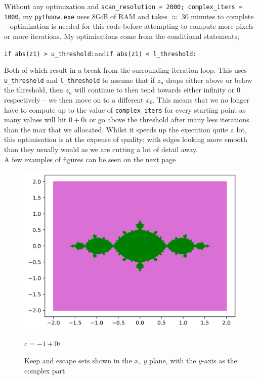 \documentclass[12pt]{article}
\begin{document}
Without any optimization and \texttt{scan\_resolution = 2000; complex\_iters = 1000}, my \texttt{pythonw.exe} uses 8GiB of RAM and takes $\approx$ 30 minutes to complete -- optimization is needed for this code before attempting to compute more pixels or more iterations.
My optimisations come from the conditional statements;
\begin{center}
	\texttt{if abs(z1) > u\_threshold:}\quad and\quad \texttt{if abs(z1) < l\_threshold:}
\end{center}
Both of which result in a break from the surrounding iteration loop. This uses \texttt{u\_threshold} and \texttt{l\_threshold} to assume that if $z_n$ drops either above or below the threshold, then $z_n$ will continue to then tend towards either infinity or 0 respectively -- we then move on to a different $x_0$. This means that we no longer have to compute up to the value of \texttt{complex\_iters} for every starting point as many values will hit $0+0i$ or go above the threshold after many less iterations than the max that we allocated. Whilst it speeds up the execution quite a lot, this optimisation is at the expense of quality; with edges looking more smooth than they usually would as we are cutting a lot of detail away.\\
A few examples of figures can be seen on the next page
\newpage
\begin{figure}[H]
	\centering
	\begin{minipage}{0.725\textwidth}
		\centering
		\hfill
		\centering
		\includegraphics[scale=0.6]{m1i0.png}
	\end{minipage}
	\hfill
	\begin{minipage}{0.2\textwidth}
		$c=-1+0i$
	\end{minipage}
	\caption{Keep and escape sets shown in the $x,\;y$ plane, with the $y$-axis as the complex part}
	\label{fig:mobAsmp}
\end{figure}
\end{document}
